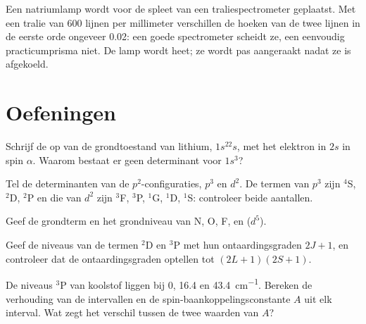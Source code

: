 \begin{inthelab}
Een natriumlamp wordt voor de spleet van een traliespectrometer
geplaatst. Met een tralie van 600 lijnen per millimeter verschillen de
hoeken van de twee lijnen in de eerste orde ongeveer \num{0.02}\textdegree:
een goede spectrometer scheidt ze, een eenvoudig practicumprisma niet. De
lamp wordt heet; ze wordt pas aangeraakt nadat ze is afgekoeld.
\end{inthelab}

\section{Oefeningen}

\begin{exercise}[$\star$]\label{exo:b3:many-electron-atoms:1}
Schrijf de  op van de grondtoestand van lithium,
$1s^22s$, met het elektron in $2s$ in spin $\alpha$. Waarom bestaat er
geen determinant voor
$1s^3$?
\end{exercise}

\begin{exercise}[$\star$]\label{exo:b3:many-electron-atoms:2}
Tel de determinanten van de $p^2$-configuraties, $p^3$ en $d^2$. De termen
van $p^3$ zijn ${}^4$S, ${}^2$D, ${}^2$P en die van $d^2$ zijn ${}^3$F, ${}^3$P, ${}^1$G,
${}^1$D, ${}^1$S: controleer beide aantallen.
\end{exercise}

\begin{exercise}[$\star$]\label{exo:b3:many-electron-atoms:3}
Geef de grondterm en het grondniveau van N, O, F,  en  ($d^5$).
\end{exercise}

\begin{exercise}[$\star$]\label{exo:b3:many-electron-atoms:4}
Geef de niveaus van de termen ${}^2$D en ${}^3$P met hun ontaardingsgraden $2J+1$,
en controleer dat de ontaardingsgraden optellen tot $(2L+1)(2S+1)$.
\end{exercise}

\begin{exercise}[$\star\star$]\label{exo:b3:many-electron-atoms:5}
De niveaus ${}^3$P van koolstof liggen bij 0, 16.4 en \qty{43.4}{cm^{-1}}. Bereken de
verhouding van de intervallen en de spin-baankoppelingsconstante $A$ uit
elk interval. Wat zegt het verschil tussen de twee waarden van $A$?
\end{exercise}


